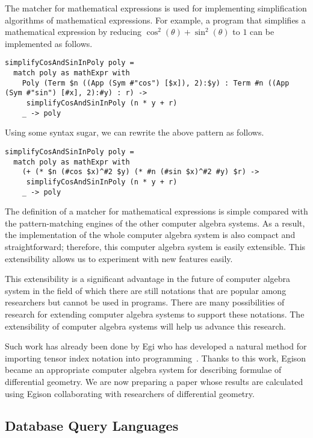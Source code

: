 \documentclass{article}
\begin{document}
The matcher for mathematical expressions is used for implementing simplification algorithms of mathematical expressions.
For example, a program that simplifies a mathematical expression by reducing $\cos^2(\theta) + \sin^2(\theta)$ to $1$ can be implemented as follows.

\begin{lstlisting}[language=egison]
simplifyCosAndSinInPoly poly =
  match poly as mathExpr with
    Poly (Term $n ((App (Sym #"cos") [$x]), 2):$y) : Term #n ((App (Sym #"sin") [#x], 2):#y) : r) ->
     simplifyCosAndSinInPoly (n * y + r)
    _ -> poly
\end{lstlisting}

\noindent Using some syntax sugar, we can rewrite the above pattern as follows.

\begin{lstlisting}[language=egison]
simplifyCosAndSinInPoly poly =
  match poly as mathExpr with
    (+ (* $n (#cos $x)^#2 $y) (* #n (#sin $x)^#2 #y) $r) ->
     simplifyCosAndSinInPoly (n * y + r)
    _ -> poly
\end{lstlisting}

The definition of a matcher for mathematical expressions is simple compared with the pattern-matching engines of the other computer algebra systems.
As a result, the implementation of the whole computer algebra system is also compact and straightforward; therefore, this computer algebra system is easily extensible.
This extensibility allows us to experiment with new features easily.

This extensibility is a significant advantage in the future of computer algebra system in the field of which there are still notations that are popular among researchers but cannot be used in programs.
There are many possibilities of research for extending computer algebra systems to support these notations.
The extensibility of computer algebra systems will help us advance this research.

Such work has already been done by Egi who has developed a natural method for importing tensor index notation into programming~\cite{egi2017scalar}.
Thanks to this work, Egison became an appropriate computer algebra system for describing formulae of differential geometry.
We are now preparing a paper whose results are calculated using Egison collaborating with researchers of differential geometry.

\subsection{Database Query Languages}\label{query-lang}
\end{document}
